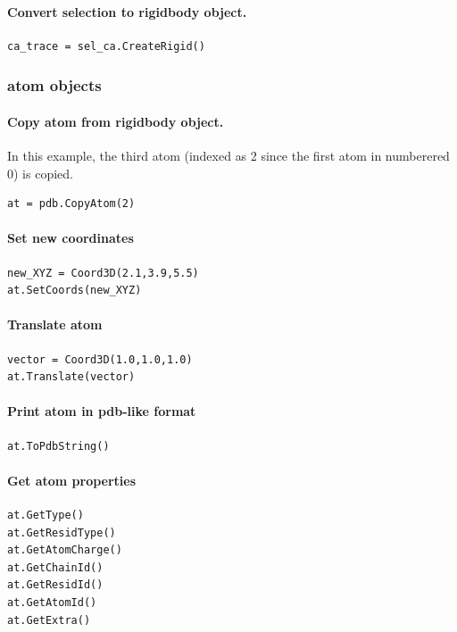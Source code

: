 \documentclass[12pt,a4paper]{article}
\begin{document}
\paragraph{Convert selection to rigidbody object.}
\begin{verbatim}
ca_trace = sel_ca.CreateRigid()
\end{verbatim}

\subsubsection{atom objects}

\paragraph{Copy atom from rigidbody object.} In this example, the third atom (indexed as 2 since the first atom in numberered 0) is copied.
\begin{verbatim}
at = pdb.CopyAtom(2)
\end{verbatim}

\paragraph{Set new coordinates}
\begin{verbatim}
new_XYZ = Coord3D(2.1,3.9,5.5)
at.SetCoords(new_XYZ)
\end{verbatim}

\paragraph{Translate atom}
\begin{verbatim}
vector = Coord3D(1.0,1.0,1.0)
at.Translate(vector)
\end{verbatim}


\paragraph{Print atom in pdb-like format}
\begin{verbatim}
at.ToPdbString()
\end{verbatim}

\paragraph{Get atom properties}
\begin{verbatim}
at.GetType()
at.GetResidType()
at.GetAtomCharge()
at.GetChainId()
at.GetResidId()
at.GetAtomId()
at.GetExtra()
\end{verbatim}
\end{document}
